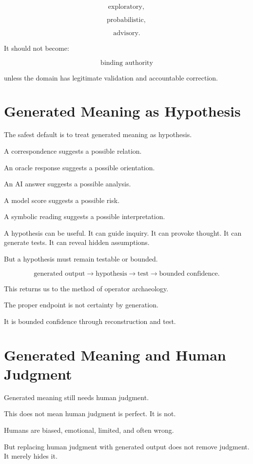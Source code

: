 \documentclass[11pt]{book}
\begin{document}
\[
\text{exploratory},
\]

\[
\text{probabilistic},
\]

\[
\text{advisory}.
\]

It should not become:

\[
\text{binding authority}
\]

unless the domain has legitimate validation and accountable correction.

\section{Generated Meaning as Hypothesis}

The safest default is to treat generated meaning as hypothesis.

A correspondence suggests a possible relation.

An oracle response suggests a possible orientation.

An AI answer suggests a possible analysis.

A model score suggests a possible risk.

A symbolic reading suggests a possible interpretation.

A hypothesis can be useful. It can guide inquiry. It can provoke thought. It can generate tests. It can reveal hidden assumptions.

But a hypothesis must remain testable or bounded.

\[
\text{generated output}
\rightarrow
\text{hypothesis}
\rightarrow
\text{test}
\rightarrow
\text{bounded confidence}.
\]

This returns us to the method of operator archaeology.

The proper endpoint is not certainty by generation.

It is bounded confidence through reconstruction and test.

\section{Generated Meaning and Human Judgment}

Generated meaning still needs human judgment.

This does not mean human judgment is perfect. It is not.

Humans are biased, emotional, limited, and often wrong.

But replacing human judgment with generated output does not remove judgment. It merely hides it.
\end{document}
